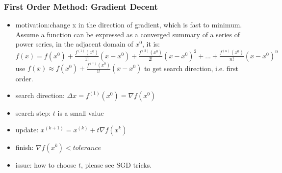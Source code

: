 \begin{frame}[c]
	\centering 
\end{frame}
\begin{frame}
\frametitle{First Order Method: Gradient Decent}
	\small
	\begin{itemize}
		\item motivation:change x in the direction of gradient, which is fast to minimum.\\
		\hspace{1cm}Assume a function can be expressed as a converged summary of a series of power series, in the adjacent domain of $x^0$, it is: \\
		 $f(x)=f(x^0)+\frac {f^{(1)}(x^0)}{1!}(x-x^0)+\frac {f^{(2)}(x^0)}{2!}(x-x^0)^2+...+\frac {f^{(n)}(x^0)}{n!}(x-x^0)^n$\\
		use $f(x) \approx f(x^0)+\frac {f^{(1)}(x^0)}{1!}(x-x^0)$ to get search direction, i.e. first order.
		\item search direction: $\Delta x=f^{(1)}(x^0)=\nabla f(x^0)$
		\item search step: $t$ is a small value
		\item update: $x^{(k+1)}=x^{(k)}+t\nabla f(x^k)$
		\item finish: $\nabla f(x^k)  < tolerance$
		\item issue: how to choose $t$, please see SGD tricks. 
	\end{itemize}
\end{frame}
